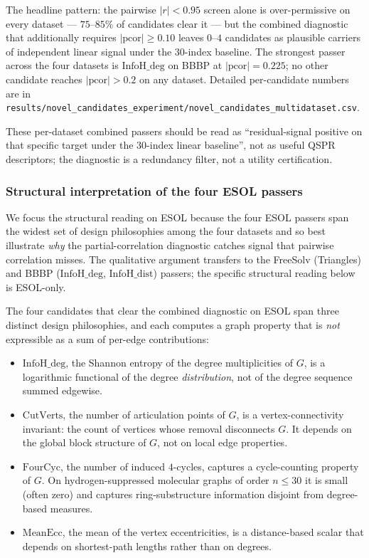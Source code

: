 \documentclass[STIX1COL]{WileyNJDv5}
\theoremstyle{definition}
\begin{document}
The headline pattern: the pairwise $|r|<0.95$ screen alone is
over-permissive on every dataset --- $75$--$85\%$ of candidates
clear it --- but the combined diagnostic that additionally
requires $|\mathrm{pcor}|\ge 0.10$ leaves $0$--$4$ candidates as
plausible carriers of independent linear signal under the
$30$-index baseline. The strongest passer across the four
datasets is $\mathrm{InfoH\_deg}$ on BBBP at $|\mathrm{pcor}|=0.225$;
no other candidate reaches $|\mathrm{pcor}|>0.2$ on any dataset.
Detailed per-candidate numbers are in
\texttt{results/novel\_candidates\_experiment/novel\_candidates\_multidataset.csv}.

These per-dataset combined passers should be read as
``residual-signal positive on that specific target under the
$30$-index linear baseline'', not as useful QSPR descriptors;
the diagnostic is a redundancy filter, not a utility
certification.

\subsubsection{Structural interpretation of the four ESOL passers}\label{sec:passer_analysis}

We focus the structural reading on ESOL because the four ESOL
passers span the widest set of design philosophies among the four
datasets and so best illustrate \emph{why} the partial-correlation
diagnostic catches signal that pairwise correlation misses. The
qualitative argument transfers to the FreeSolv (Triangles) and BBBP
($\mathrm{InfoH\_deg}$, $\mathrm{InfoH\_dist}$) passers; the
specific structural reading below is ESOL-only.

The four candidates that clear the combined diagnostic on ESOL span
three distinct design philosophies, and each computes a graph
property that is \emph{not} expressible as a sum of per-edge
contributions:

\begin{itemize}
\item $\mathrm{InfoH\_deg}$, the Shannon entropy of the degree
multiplicities of $G$, is a logarithmic functional of the degree
\emph{distribution}, not of the degree sequence summed edgewise.
\item $\mathrm{CutVerts}$, the number of articulation points of $G$,
is a vertex-connectivity invariant: the count of vertices whose
removal disconnects $G$. It depends on the global block structure
of $G$, not on local edge properties.
\item $\mathrm{FourCyc}$, the number of induced $4$-cycles, captures
a cycle-counting property of $G$. On hydrogen-suppressed molecular
graphs of order $n \le 30$ it is small (often zero) and captures
ring-substructure information disjoint from degree-based measures.
\item $\mathrm{MeanEcc}$, the mean of the vertex eccentricities, is
a distance-based scalar that depends on shortest-path lengths
rather than on degrees.
\end{itemize}
\end{document}
